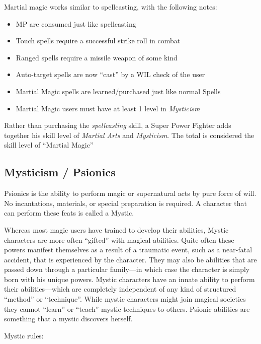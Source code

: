Martial magic works similar to spellcasting, with the following notes:

\begin{itemize}
\item MP are consumed just like spellcasting
\item Touch spells require a successful strike roll in combat
\item Ranged spells require a missile weapon of some kind
\item Auto-target spells are now ``cast'' by a WIL check of the user
\item Martial Magic spells are learned/purchased just like normal Spells
\item Martial Magic users must have at least 1 level in \emph{Mysticism}
\end{itemize}

Rather than purchasing the \emph{spellcasting} skill, a Super Power
Fighter adds together his skill level of \emph{Martial Arts} and
\emph{Mysticism}.  The total is considered the skill level of
``Martial Magic''

\subsection{Mysticism / Psionics}

Psionics is the ability to perform magic or supernatural acts by pure
force of will.  No incantations, materials, or special preparation is
required.  A character that can perform these feats is called a
Mystic.

Whereas most magic users have trained to develop their abilities,
Mystic characters are more often ``gifted'' with magical abilities.
Quite often these powers manifest themselves as a result of a
traumatic event, such as a near-fatal accident, that is experienced by
the character.  They may also be abilities that are passed down
through a particular family---in which case the character is simply
born with his unique powers.  Mystic characters have an innate ability
to perform their abilities---which are completely independent of any
kind of structured ``method'' or ``technique''.  While mystic
characters might join magical societies they cannot ``learn'' or
``teach'' mystic techniques to others.  Psionic abilities are
something that a mystic discovers herself.

Mystic rules:

